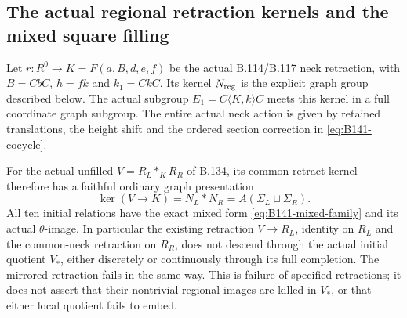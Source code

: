 \subsection*{The actual regional retraction kernels and the mixed square filling}

\label{stmt:B141}
Let $r:R^0\to K=F(a,B,d,e,f)$ be the actual B.114/B.117
neck retraction, with $B=CbC$, $h=fk$ and $k_1=CkC$.
Its kernel $N_{\rm reg}$ is the explicit graph group described below.
The actual subgroup $E_1=C\langle K,k\rangle C$ meets this kernel
in a full coordinate graph subgroup. The entire actual neck action
is given by retained translations, the height shift and the ordered
section correction in \eqref{eq:B141-cocycle}.

For the actual unfilled $V=R_L*_KR_R$ of B.134, its common-retract
kernel therefore has a faithful ordinary graph presentation
\begin{equation}\label{eq:B141-ambient-kernel}
\ker(V\to K)=N_L*N_R=A(\Sigma_L\sqcup\Sigma_R).
\end{equation}
All ten initial relations have the exact mixed form
\eqref{eq:B141-mixed-family} and its actual $\theta$-image.
In particular the existing retraction $V\to R_L$, identity on
$R_L$ and the common-neck retraction on $R_R$, does not descend
through the actual initial quotient $V_*$, either discretely or
continuously through its full completion. The mirrored retraction
fails in the same way. This is failure of specified retractions;
it does not assert that their nontrivial regional images are killed
in $V_*$, or that either local quotient fails to embed.

